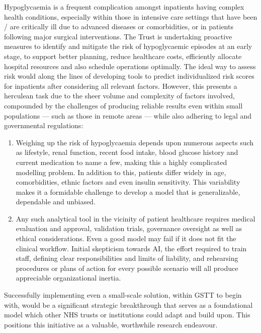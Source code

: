 \vspace{10pt}
\par{\noindent Hypoglycaemia is a frequent complication amongst inpatients having complex health conditions, especially within those in intensive care settings that have been / are critically ill due to advanced diseases or comorbidities, or in patients following major surgical interventions. The Trust is undertaking proactive measures to identify and mitigate the risk of hypoglycaemic episodes at an early stage, to support better planning, reduce healthcare costs, efficiently allocate hospital resources and also schedule operations optimally. The ideal way to assess risk would along the lines of developing tools to predict individualized risk scores for inpatients after considering all relevant factors. However, this presents a herculean task due to the sheer volume and complexity of factors involved, compounded by the challenges of producing reliable results even within small populations — such as those in remote areas — while also adhering to legal and governmental regulations: 
\begin{enumerate}
	\item Weighing up the risk of hypoglycaemia depends upon numerous aspects such as lifestyle, renal function, recent food intake, blood glucose history and current medication to name a few, making this a highly complicated modelling problem. In addition to this, patients differ widely in age, comorbidities, ethnic factors and even insulin sensitivity. This variability makes it a formidable challenge to develop a model that is generalizable, dependable and unbiased.
	\item Any such analytical tool in the vicinity of patient healthcare requires medical evaluation and approval, validation trials, governance oversight as well as ethical considerations. Even a good model may fail if it does not fit the clinical workflow. Initial skepticism towards AI, the effort required to train staff, defining clear responsibilities and limits of liability, and rehearsing procedures or plans of action for every possible scenario will all produce appreciable organizational inertia.
\end{enumerate}
}

\vspace{10pt}
\par{\noindent Successfully implementing even a small-scale solution, within GSTT to begin with, would be a significant strategic breakthrough that serves as a foundational model which other NHS trusts or institutions could adapt and build upon. This positions this initiative as a valuable, worthwhile research endeavour.}


